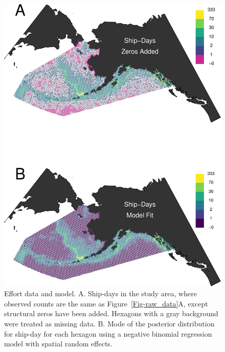 \documentclass[11pt, titlepage]{article}
\begin{document}
\begin{spacing}{1.9}
\begin{flushleft}
\begin{figure}[H]
  \begin{center}
  \includegraphics[width=.75\linewidth]{Fig-effort}
  \end{center}
  \caption{Effort data and model. A. Ship-days in the study area, where observed counts are the same as Figure~\ref{Fig-raw_data}A, except structural zeros have been added. Hexagons with a gray background were treated as missing data. B. Mode of the posterior distribution for ship-day for each hexagon using a negative binomial regression model with spatial random effects.  \label{Fig-Effort}}         
\end{figure} 


\end{flushleft}
\end{spacing}
\end{document}
